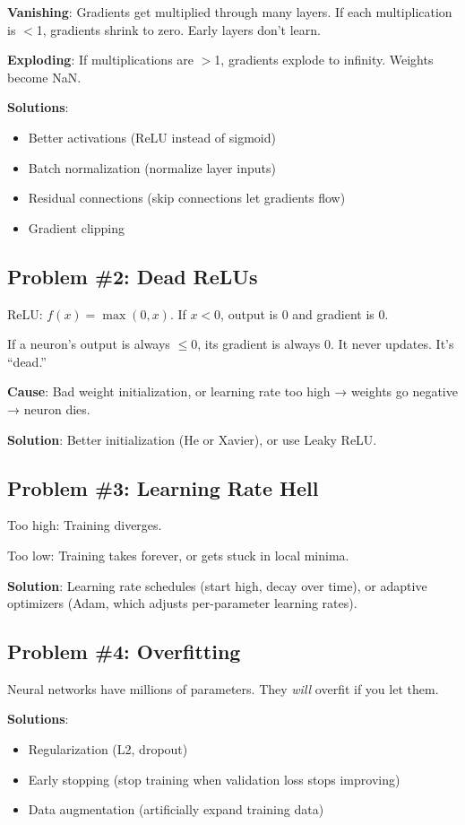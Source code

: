 \textbf{Vanishing}: Gradients get multiplied through many layers. If each multiplication is $<$1, gradients shrink to zero. Early layers don't learn.

\textbf{Exploding}: If multiplications are $>$1, gradients explode to infinity. Weights become NaN.

\textbf{Solutions}:
\begin{itemize}
\item Better activations (ReLU instead of sigmoid)
\item Batch normalization (normalize layer inputs)
\item Residual connections (skip connections let gradients flow)
\item Gradient clipping
\end{itemize}

\subsection{Problem \#2: Dead ReLUs}

ReLU: $f(x) = \max(0, x)$. If $x < 0$, output is 0 and gradient is 0.

If a neuron's output is always $\leq 0$, its gradient is always 0. It never updates. It's ``dead.''

\textbf{Cause}: Bad weight initialization, or learning rate too high → weights go negative → neuron dies.

\textbf{Solution}: Better initialization (He or Xavier), or use Leaky ReLU.

\subsection{Problem \#3: Learning Rate Hell}

Too high: Training diverges.

Too low: Training takes forever, or gets stuck in local minima.

\textbf{Solution}: Learning rate schedules (start high, decay over time), or adaptive optimizers (Adam, which adjusts per-parameter learning rates).

\subsection{Problem \#4: Overfitting}

Neural networks have millions of parameters. They \textit{will} overfit if you let them.

\textbf{Solutions}:
\begin{itemize}
\item Regularization (L2, dropout)
\item Early stopping (stop training when validation loss stops improving)
\item Data augmentation (artificially expand training data)
\end{itemize}

